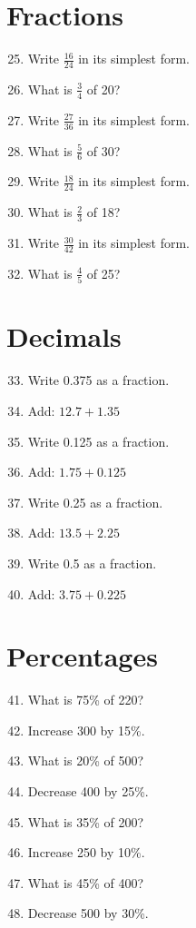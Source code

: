 \documentclass[10pt,a4paper]{article}
\begin{document}
\section*{Fractions}

\begin{enumerate}
\setcounter{enumi}{24}
\item Write $\frac{16}{24}$ in its simplest form.
\item What is $\frac{3}{4}$ of 20?
\item Write $\frac{27}{36}$ in its simplest form.
\item What is $\frac{5}{6}$ of 30?
\item Write $\frac{18}{24}$ in its simplest form.
\item What is $\frac{2}{3}$ of 18?
\item Write $\frac{30}{42}$ in its simplest form.
\item What is $\frac{4}{5}$ of 25?
\end{enumerate}

\section*{Decimals}

\begin{enumerate}
\setcounter{enumi}{32}
\item Write 0.375 as a fraction.
\item Add: $12.7 + 1.35$
\item Write 0.125 as a fraction.
\item Add: $1.75 + 0.125$
\item Write 0.25 as a fraction.
\item Add: $13.5 + 2.25$
\item Write 0.5 as a fraction.
\item Add: $3.75 + 0.225$
\end{enumerate}

\section*{Percentages}

\begin{enumerate}
\setcounter{enumi}{40}
\item What is 75\% of 220?
\item Increase 300 by 15\%.
\item What is 20\% of 500?
\item Decrease 400 by 25\%.
\item What is 35\% of 200?
\item Increase 250 by 10\%.
\item What is 45\% of 400?
\item Decrease 500 by 30\%.
\end{enumerate}
\end{document}
